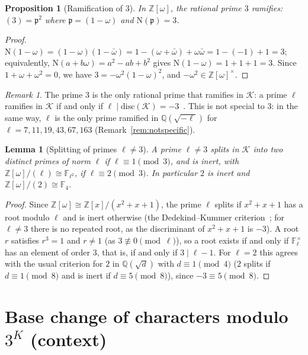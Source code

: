 \documentclass[12pt]{amsart}
\theoremstyle{plain}
\newtheorem{proposition}[theorem]{Proposition}
\newtheorem{lemma}[theorem]{Lemma}
\theoremstyle{definition}
\theoremstyle{remark}
\newtheorem{remark}[theorem]{Remark}
\newcommand{\Z}{\mathbb{Z}}
\newcommand{\Q}{\mathbb{Q}}
\newcommand{\F}{\mathbb{F}}
\newcommand{\Zomega}{\Z[\omega]}
\newcommand{\K}{\mathcal{K}}          %
\newcommand{\Nf}{\mathrm{N}}          %
\newcommand{\disc}{\mathrm{disc}}
\newcommand{\pp}{\mathfrak{p}}        %
\begin{document}
\begin{proposition}[Ramification of $3$]
\label{prop:ram}
In $\Zomega$, the rational prime $3$ ramifies: $(3) = \pp^2$ where
$\pp = (1-\omega)$ and $\Nf(\pp) = 3$.
\end{proposition}

\begin{proof}
$\Nf(1-\omega) = (1-\omega)(1-\bar\omega) = 1 - (\omega + \bar\omega) +
\omega\bar\omega = 1 - (-1) + 1 = 3$; equivalently, $\Nf(a+b\omega) =
a^2-ab+b^2$ gives $\Nf(1-\omega) = 1+1+1 = 3$. Since $1+\omega+\omega^2=0$,
we have $3 = -\omega^2(1-\omega)^2$, and $-\omega^2 \in \Zomega^\times$.
\end{proof}

\begin{remark}
The prime $3$ is the only rational prime that ramifies in $\K$: a prime
$\ell$ ramifies in $\K$ if and only if $\ell \mid \disc(\K) =
-3$~\cite{Neukirch1999}. This is not special to $3$: in the same way, $\ell$
is the only prime ramified in $\Q(\sqrt{-\ell})$ for
$\ell = 7, 11, 19, 43, 67, 163$ (Remark~\ref{rem:notspecific}).
\end{remark}

\begin{lemma}[Splitting of primes $\ell \neq 3$]
\label{lem:split}
A prime $\ell \neq 3$ splits in $\K$ into two distinct primes of norm $\ell$
if $\ell \equiv 1 \pmod 3$, and is inert, with $\Zomega/(\ell) \cong
\F_{\ell^2}$, if $\ell \equiv 2 \pmod 3$. In particular $2$ is inert and
$\Zomega/(2) \cong \F_4$.
\end{lemma}

\begin{proof}
Since $\Zomega \cong \Z[x]/(x^2+x+1)$, the prime $\ell$ splits if
$x^2 + x + 1$ has a root modulo $\ell$ and is inert otherwise (the
Dedekind--Kummer criterion~\cite{Neukirch1999}; for $\ell \neq 3$ there is no
repeated root, as the discriminant of $x^2+x+1$ is $-3$). A root $r$
satisfies $r^3 = 1$ and $r \neq 1$ (as $3 \not\equiv 0 \pmod \ell$), so a
root exists if and only if $\F_\ell^\times$ has an element of order $3$,
that is, if and only if $3 \mid \ell - 1$. For $\ell = 2$ this agrees with
the usual criterion for $2$ in $\Q(\sqrt d)$ with $d \equiv 1 \pmod 4$
($2$ splits if $d \equiv 1 \pmod 8$ and is inert if $d \equiv 5 \pmod 8$),
since $-3 \equiv 5 \pmod 8$.
\end{proof}

\section{Base change of characters modulo $3^K$ (context)}
\label{sec:basechange}
\end{document}
